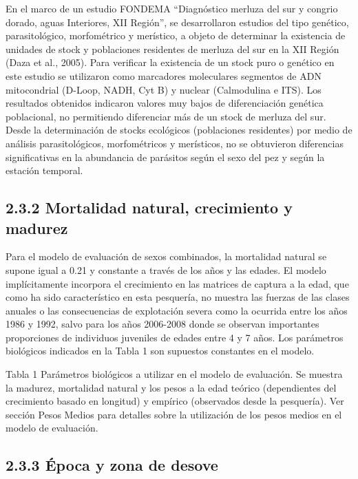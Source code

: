 \documentclass[
  spanish,
]{article}
\begin{document}
En el marco de un estudio FONDEMA ``Diagnóstico merluza del sur y
congrio dorado, aguas Interiores, XII Región'', se desarrollaron
estudios del tipo genético, parasitológico, morfométrico y merístico, a
objeto de determinar la existencia de unidades de stock y poblaciones
residentes de merluza del sur en la XII Región (Daza et al., 2005). Para
verificar la existencia de un stock puro o genético en este estudio se
utilizaron como marcadores moleculares segmentos de ADN mitocondrial
(D-Loop, NADH, Cyt B) y nuclear (Calmodulina e ITS). Los resultados
obtenidos indicaron valores muy bajos de diferenciación genética
poblacional, no permitiendo diferenciar más de un stock de merluza del
sur. Desde la determinación de stocks ecológicos (poblaciones
residentes) por medio de análisis parasitológicos, morfométricos y
merísticos, no se obtuvieron diferencias significativas en la abundancia
de parásitos según el sexo del pez y según la estación temporal.

\hypertarget{mortalidad-natural-crecimiento-y-madurez}{%
\subsection{2.3.2 Mortalidad natural, crecimiento y
madurez}\label{mortalidad-natural-crecimiento-y-madurez}}

Para el modelo de evaluación de sexos combinados, la mortalidad natural
se supone igual a 0.21 y constante a través de los años y las edades. El
modelo implícitamente incorpora el crecimiento en las matrices de
captura a la edad, que como ha sido característico en esta pesquería, no
muestra las fuerzas de las clases anuales o las consecuencias de
explotación severa como la ocurrida entre los años 1986 y 1992, salvo
para los años 2006-2008 donde se observan importantes proporciones de
individuos juveniles de edades entre 4 y 7 años. Los parámetros
biológicos indicados en la Tabla 1 son supuestos constantes en el
modelo.

Tabla 1 Parámetros biológicos a utilizar en el modelo de evaluación. Se
muestra la madurez, mortalidad natural y los pesos a la edad teórico
(dependientes del crecimiento basado en longitud) y empírico (observados
desde la pesquería). Ver sección Pesos Medios para detalles sobre la
utilización de los pesos medios en el modelo de evaluación.

\hypertarget{uxe9poca-y-zona-de-desove}{%
\subsection{2.3.3 Época y zona de
desove}\label{uxe9poca-y-zona-de-desove}}
\end{document}
